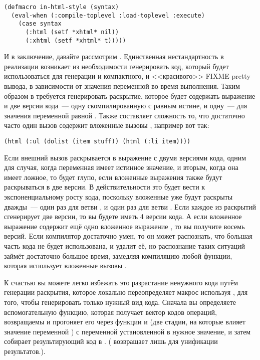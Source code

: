 \begin{lstlisting}
(defmacro in-html-style (syntax)
  (eval-when (:compile-toplevel :load-toplevel :execute)
    (case syntax
      (:html (setf *xhtml* nil))
      (:xhtml (setf *xhtml* t)))))
\end{lstlisting}

И в заключение, давайте рассмотрим .  Единственная нестандартность в реализации
 возникает из необходимости генерировать код, который будет использоваться для
генерации и компактного, и <<красивого>> FIXME pretty вывода, в зависимости от значения
переменной  во время выполнения.  Таким образом в  требуется
генерировать раскрытие, которое будет содержать выражение и две версии кода~---
одну скомпилированную с  равным истине, и одну~--- для значения переменной
равной .  Также составляет сложность то, что достаточно часто один вызов
 содержит вложенные вызовы , например вот так:

\begin{lstlisting}
(html (:ul (dolist (item stuff)) (html (:li item))))
\end{lstlisting}

Если внешний вызов  раскрывается в выражение  с двумя версиями кода,
одним для случая, когда переменная  имеет истинное значение, и вторым,
когда она имеет ложное, то будет глупо, если вложенные выражения  также будут
раскрываться в две версии.  В действительности это будет вести к экспоненциальному росту
кода, поскольку вложенные  уже будут раскрыты дважды~--- один раз для ветви
, и один раз для ветви .  Если каждое из
раскрытий сгенерирует две версии, то вы будете иметь 4 версии кода.  А если вложенное
выражение  содержит ещё одно вложенное выражение , то вы получите
восемь версий.  Если компилятор достаточно умен, то он может распознать, что большая часть
кода не будет использована, и удалит её, но распознание таких ситуаций займёт достаточно
большое время, замедляя компиляцию любой функции, которая использует вложенные вызовы
.

К счастью вы можете легко избежать это разрастание ненужного кода путём генерации
раскрытия, которое локально переопределяет макрос  используя ,
для того, чтобы генерировать только нужный вид кода.  Сначала вы определяете
вспомогательную функцию, которая получает вектор кодов операций, возвращаемы
 и прогоняет его через функции  и
 (две стадии, на которые влияет значение переменной ) с
переменной  установленной в нужное значение, и затем собирает
результирующий код в . ( возвращает  лишь для унификации
результатов.).

